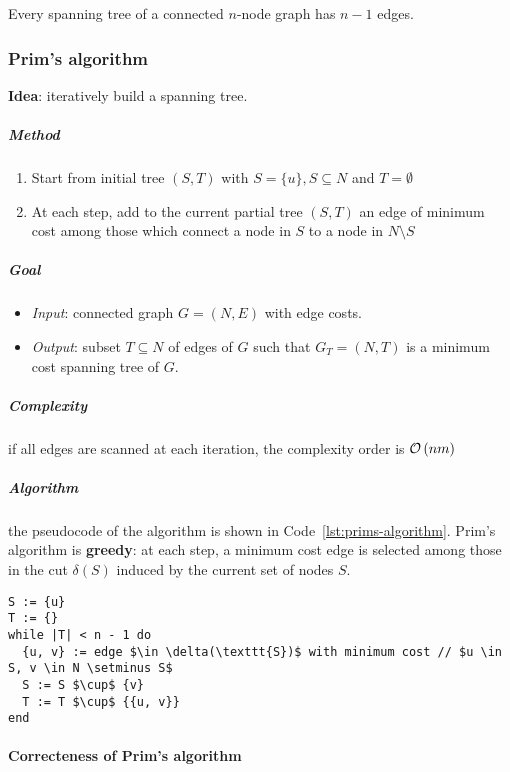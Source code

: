\documentclass[english]{article}
\begin{document}
\begin{property}
  Every spanning tree of a connected \(n\)-node graph has \(n-1\) edges.
\end{property}

\subsubsection{Prim's algorithm}

\textbf{Idea}: iteratively build a spanning tree.

\subparagraph*{Method}
\begin{enumerate}
  \item Start from initial tree \((S, T)\) with \(S = \{u\}, S \subseteq N\) and \(T = \emptyset\)
  \item At each step, add to the current partial tree \((S, T)\) an edge of minimum cost among those which connect a node in \(S\) to a node in \(N \setminus S\)
\end{enumerate}

\subparagraph*{Goal}
\begin{itemize}[label=\(\rightarrow\)]
  \item \textit{Input}: connected graph \(G = (N, E)\) with edge costs.
  \item \textit{Output}: subset \(T \subseteq N\) of edges of \(G\) such that \(G_T = (N, T)\) is a minimum cost spanning tree of \(G\).
\end{itemize}

\subparagraph*{Complexity}
if all edges are scanned at each iteration, the complexity order is \(\mathcal{O}\left(nm\right)\)

\subparagraph*{Algorithm}
the pseudocode of the algorithm is shown in Code~\ref{lst:prims-algorithm}.
Prim's algorithm is \textbf{greedy}:
at each step, a minimum cost edge is selected among those in the cut \(\delta(S)\) induced by the current set of nodes \(S\).

\begin{lstlisting}[caption={Prim's algorithm}, label={lst:prims-algorithm}, float]
S := {u}
T := {}
while |T| < n - 1 do
  {u, v} := edge $\in \delta(\texttt{S})$ with minimum cost // $u \in S, v \in N \setminus S$
  S := S $\cup$ {v}
  T := T $\cup$ {{u, v}}
end
\end{lstlisting}

\paragraph{Correcteness of Prim's algorithm}
\end{document}
